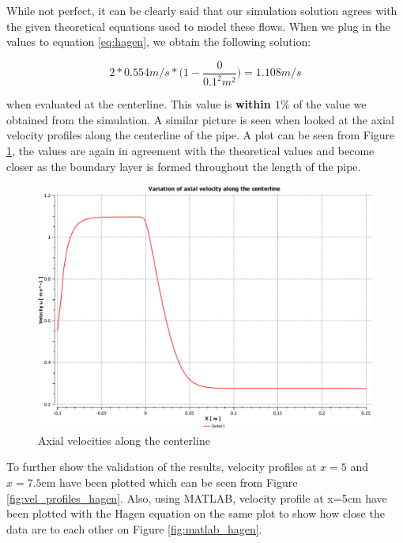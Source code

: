 \noindent While not perfect, it can be clearly said that our simulation solution agrees with the given theoretical equations used to model these flows. When we plug in the values to equation \ref{eq:hagen}, we obtain the following solution:

\[ 2*0.554m/s * \Big(1 - \frac{0}{0.1^{2}m^{2}}\Big) = 1.108 m/s \] 

\noindent when evaluated at the centerline. This value is \textbf{within $1\%$} of the value we obtained from the simulation. A similar picture is seen when looked at the axial velocity profiles along the centerline of the pipe. A plot can be seen from Figure \ref{fig:axial}, the values are again in agreement with the theoretical values and become closer as the boundary layer is formed throughout the length of the pipe. 

\begin{figure}[H]
    \centering
    \includegraphics[width=15cm]{images/task1/axial.png}
    \caption{Axial velocities along the centerline}
    \label{fig:axial}
\end{figure}

\noindent To further show the validation of the results, velocity profiles at $x=5$ and $x=7.5$cm have been plotted which can be seen from Figure \ref{fig:vel_profiles_hagen}. Also, using MATLAB, velocity profile at x=5cm have been plotted with the Hagen equation on the same plot to show how close the data are to each other on Figure \ref{fig:matlab_hagen}.




